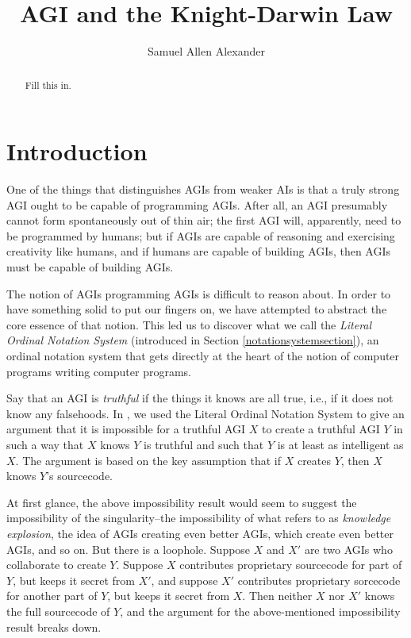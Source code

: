 \documentclass[runningheads]{llncs}
\begin{document}
\title{AGI and the Knight-Darwin Law}

\author{Samuel Allen Alexander}

\maketitle

\begin{abstract}
Fill this in.

\end{abstract}

\section{Introduction}

One of the things that distinguishes AGIs from weaker AIs is that a truly
strong AGI ought to be capable of programming AGIs. After all, an AGI
presumably cannot form spontaneously out of thin air; the first AGI will,
apparently, need to be programmed by humans; but if AGIs are capable of
reasoning and exercising creativity like humans, and if humans are capable
of building AGIs, then AGIs must be capable of building AGIs.

The notion of AGIs programming AGIs is difficult to reason about. In order
to have something solid to put our fingers on, we have attempted to abstract
the core essence of that notion. This led us to discover
what we call the \emph{Literal Ordinal Notation System} (introduced in Section
\ref{notationsystemsection}), an ordinal notation system that gets directly at
the heart of the notion of computer programs writing computer programs.

Say that an AGI is \emph{truthful} if the things it knows are all true,
i.e., if it does not know any falsehoods.
In \cite{alexander2019measuring}, we used the Literal Ordinal Notation System to give an
argument
that it is impossible for a truthful AGI $X$ to create a
truthful AGI $Y$ in such a way that $X$ knows $Y$ is truthful
and such that $Y$ is at least as intelligent as $X$.
The argument is based on the key assumption that if $X$ creates $Y$, then $X$
knows $Y$'s sourcecode.

At first glance, the above impossibility result would
seem to suggest the impossibility of the singularity--the impossibility of
what \cite{hutter2012} refers to as \emph{knowledge explosion}, the idea of
AGIs creating even better AGIs, which create even better AGIs, and so on.
But there is a loophole. Suppose $X$ and $X'$ are two AGIs
who collaborate to create $Y$. Suppose $X$ contributes proprietary sourcecode for
part of $Y$, but keeps it secret from $X'$, and suppose $X'$ contributes proprietary
sorcecode for another part of $Y$, but keeps it secret from $X$. Then neither
$X$ nor $X'$ knows the full sourcecode of $Y$, and the argument for the
above-mentioned impossibility result breaks down.
\end{document}
